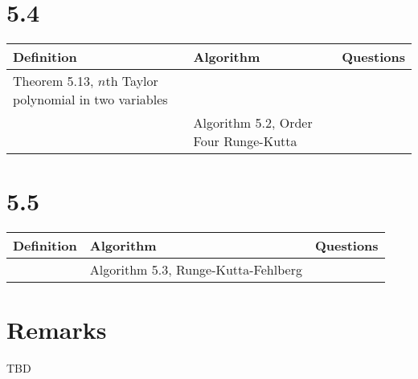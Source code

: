 \documentclass{article}
\begin{document}
\section*{5.4}

\begin{tabularx}{\textwidth}{ |X|X|c| }
    \hline
	{\bf Definition} & {\bf Algorithm} & {\bf Questions} \\
    \hline
	Theorem 5.13, $n$th Taylor polynomial in two variables & & \\
    \hline
	 & Algorithm 5.2, Order Four Runge-Kutta & \\
    \hline
\end{tabularx}

\section*{5.5}

\begin{tabularx}{\textwidth}{ |X|X|c| }
    \hline
	{\bf Definition} & {\bf Algorithm} & {\bf Questions} \\
    \hline
	 & Algorithm 5.3, Runge-Kutta-Fehlberg &\\
    \hline
\end{tabularx}

\section*{Remarks}

TBD
\end{document}
